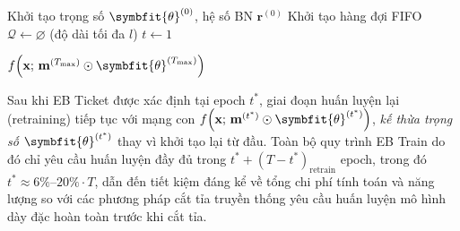 \begin{algorithm}[H]
    \DontPrintSemicolon
    \SetAlgoLined


    \BlankLine
    Khởi tạo trọng số $\symbfit{\theta}^{(0)}$, hệ số BN $\mathbf{r}^{(0)}$\;
    Khởi tạo hàng đợi FIFO $\mathcal{Q} \leftarrow \varnothing$ (độ dài tối đa $l$)\;
    $t \leftarrow 1$\;

    \BlankLine
    \Return \ensuremath{f\!\left(\mathbf{x};\,\mathbf{m}^{(T_{\max})} \odot \symbfit{\theta}^{(T_{\max})}\right)}

    \caption{Tìm kiếm Early-Bird Ticket (EB Search)}
    \label{alg:eb_search}
\end{algorithm}
\bigskip
Sau khi EB Ticket được xác định tại epoch $t^*$, giai đoạn huấn luyện lại (retraining) tiếp tục
với mạng con $f\!\left(\mathbf{x};\,\mathbf{m}^{(t^*)} \odot \symbfit{\theta}^{(t^*)}\right)$,
\emph{kế thừa trọng số} $\symbfit{\theta}^{(t^*)}$ thay vì khởi tạo lại từ đầu.
Toàn bộ quy trình EB Train do đó chỉ yêu cầu huấn luyện đầy đủ trong $t^* + (T - t^*)_{\text{retrain}}$
epoch, trong đó $t^* \approx 6\%$--$20\% \cdot T$, dẫn đến tiết kiệm đáng kể về tổng chi phí tính toán
và năng lượng so với các phương pháp cắt tỉa truyền thống yêu cầu huấn luyện mô hình dày đặc
hoàn toàn trước khi cắt tỉa.

